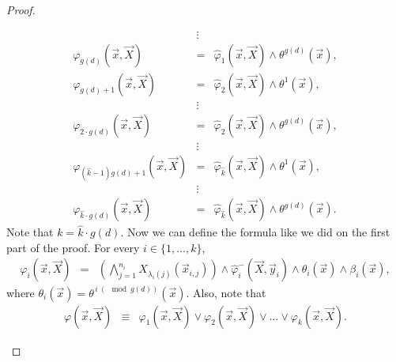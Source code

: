 \documentclass[12pt]{article}
\def\X{\vec{X}}
\def\x{\vec{x}} %
\def\y{\vec{y}} %
\begin{document}
\begin{proof}
\begin{enumerate}
\begin{eqnarray*}
& \vdots & \\
\varphi_{g(d)}(\x,\X) &=& \hat{\varphi}_1(\x,\X) \wedge \theta^{g(d)}(\x), \\
\varphi_{g(d)+1}(\x,\X) &=& \hat{\varphi}_2(\x,\X) \wedge \theta^1(\x), \\
& \vdots & \\
\varphi_{2\cdot g(d)}(\x,\X) &=& \hat{\varphi}_2(\x,\X) \wedge \theta^{g(d)}(\x), \\
& \vdots & \\
\varphi_{(\hat{k}-1) g(d)+1}(\x,\X) &=& \hat{\varphi}_{\hat{k}}(\x,\X) \wedge \theta^1(\x), \\
& \vdots & \\
\varphi_{\hat{k} \cdot g(d)}(\x,\X) &=& \hat{\varphi}_{\hat{k}}(\x,\X) \wedge \theta^{g(d)}(\x).
\end{eqnarray*}
Note that $k = \hat{k} \cdot g(d).$ Now we can define the formula like we did on the first part of the proof. For every $i\in\{1,\ldots,k\}$,
\begin{eqnarray*}
\varphi_i(\x,\X) &=& \left( \bigwedge_{j=1}^{n_i} X_{\lambda_i(j)}(\x_{i,j}) \right) \wedge \hat{\varphi}^{-}_i(\X,\y_i) \wedge \theta_i(\x) \wedge \beta_i(\x),
\end{eqnarray*}
where $\theta_i(\x) = \theta^{\,i\:(\!\!\!\!\mod g(d))}(\x).$ Also, note that
\begin{eqnarray*}
\varphi(\x,\X) &\equiv& \varphi_1(\x,\X) \vee \varphi_2(\x,\X) \vee \dots  \vee \varphi_k(\x,\X).
\end{eqnarray*}


\end{enumerate}
\end{proof}
\end{document}
